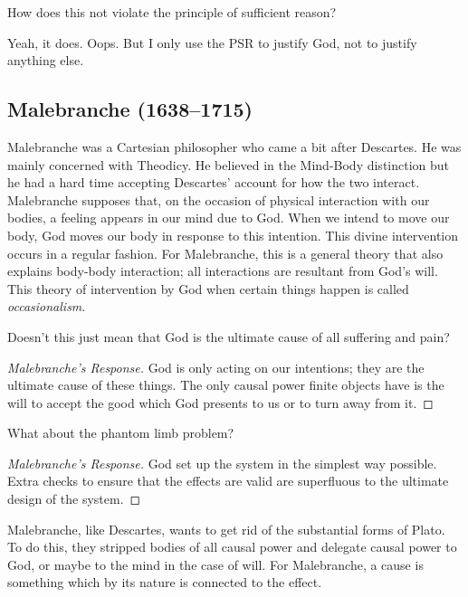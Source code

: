 \begin{problem}
How does this not violate the principle of sufficient reason?

\begin{solution}
Yeah, it does. Oops. But I only use the PSR to justify God, not to justify anything else.
\end{solution}
\end{problem}

\subsection{Malebranche (1638--1715)}

Malebranche was a Cartesian philosopher who came a bit after Descartes. He was mainly concerned with Theodicy. He believed in the Mind-Body distinction but he had a hard time accepting Descartes' account for how the two interact. Malebranche supposes that, on the occasion of physical interaction with our bodies, a feeling appears in our mind due to God. When we intend to move our body, God moves our body in response to this intention. This divine intervention occurs in a regular fashion. For Malebranche, this is a general theory that also explains body-body interaction; all interactions are resultant from God's will. This theory of intervention by God when certain things happen is called \emph{occasionalism}.

\begin{problem}
Doesn't this just mean that God is the ultimate cause of all suffering and pain?

\begin{proof}[Malebranche's Response]
God is only acting on our intentions; they are the ultimate cause of these things. The only causal power finite objects have is the will to accept the good which God presents to us or to turn away from it.
\end{proof}
\end{problem}

\begin{problem}
What about the phantom limb problem?

\begin{proof}[Malebranche's Response]
God set up the system in the simplest way possible. Extra checks to ensure that the effects are valid are superfluous to the ultimate design of the system.
\end{proof}
\end{problem}

Malebranche, like Descartes, wants to get rid of the  substantial forms of Plato. To do this, they stripped bodies of all causal power and delegate causal power to God, or maybe to the mind in the case of will. For Malebranche, a cause is something which by its nature is connected to the effect.